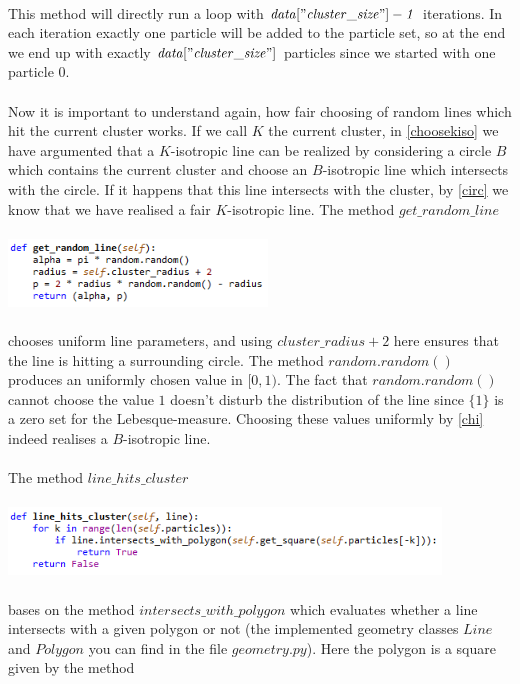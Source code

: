 \documentclass[12pt,a4paper]{scrartcl}
\numberwithin{equation}{subsection}
\newcommand{\1}{\mathbbm{1}}
\numberwithin{equation}{section}
\theoremstyle{definition}
\begin{document}
\\
This method will directly run a loop with $\mathit{data["cluster\_size"] - 1}$ iterations. In each iteration exactly one particle will be added to the particle set, so at the end we end up with exactly $\mathit{data["cluster\_size"]}$ particles since we started with one particle 0. \\
\\Now it is important to understand again, how fair choosing of random lines which hit the current cluster works. If we call $K$ the current cluster, in \ref{choosekiso} we have argumented that a $K$-isotropic line can be realized by considering a circle $B$ which contains the current cluster and choose an $B$-isotropic line which intersects with the circle. If it happens that this line intersects with the cluster, by \ref{circ} we know that we have realised a fair $K$-isotropic line. The method $\mathit{get\_random\_line}$ \\
\\
\includegraphics[height=1.8cm]{images/code-snippets/randomline.png} \\
\\
chooses uniform line parameters, and using $\mathit{cluster\_radius + 2}$ here ensures that the line is hitting a surrounding circle. The method $\mathit{random.random()}$ produces an uniformly chosen value in $[0,1)$. The fact that $\mathit{random.random()}$ cannot choose the value $1$ doesn't disturb the distribution of the line since $\{1\}$ is a zero set for the Lebesque-measure. Choosing these values uniformly by \ref{chi} indeed realises a $B$-isotropic line. \\
\\The method $\mathit{line\_hits\_cluster}$ \\
\\
\includegraphics[height=1.8cm]{images/code-snippets/linehitscluster.png} \\
\\
bases on the method $\mathit{intersects\_with\_polygon}$ which evaluates whether a line intersects with a given polygon or not (the implemented geometry classes $\mathit{Line}$ and $\mathit{Polygon}$ you can find in the file $\mathit{geometry.py}$). Here the polygon is a square given by the method \\
\end{document}
